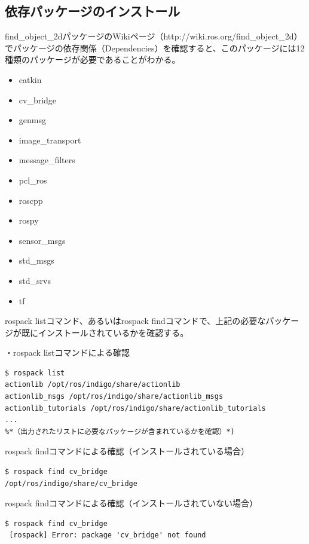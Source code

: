 \subsection{依存パッケージのインストール}

find\_object\_2dパッケージのWikiページ（http://wiki.ros.org/find\_object\_2d）でパッケージの依存関係（Dependencies）を確認すると、このパッケージには12種類のパッケージが必要であることがわかる。

\begin{itemize}
\item catkin
\item cv\_bridge
\item genmsg
\item image\_transport
\item message\_filters
\item pcl\_ros
\item roscpp
\item rospy
\item sensor\_msgs
\item std\_msgs
\item std\_srvs
\item tf
\end{itemize}

rospack listコマンド、あるいはrospack findコマンドで、上記の必要なパッケージが既にインストールされているかを確認する。

・rospack listコマンドによる確認
\begin{lstlisting}[language=ROS]
$ rospack list
actionlib /opt/ros/indigo/share/actionlib
actionlib_msgs /opt/ros/indigo/share/actionlib_msgs
actionlib_tutorials /opt/ros/indigo/share/actionlib_tutorials
...
%*（出力されたリストに必要なパッケージが含まれているかを確認）*)
\end{lstlisting}

rospack findコマンドによる確認（インストールされている場合）

\begin{lstlisting}[language=ROS]
$ rospack find cv_bridge
/opt/ros/indigo/share/cv_bridge
\end{lstlisting}

rospack findコマンドによる確認（インストールされていない場合）

\begin{lstlisting}[language=ROS]
$ rospack find cv_bridge
 [rospack] Error: package 'cv_bridge' not found
\end{lstlisting}

